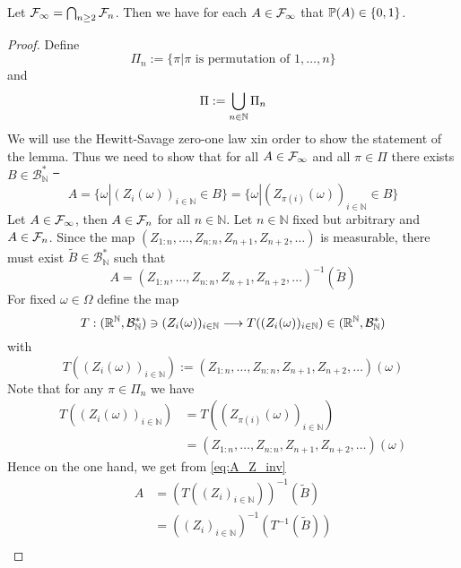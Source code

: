 \begin{lemma} \label{lem:hewitt_savage}
	Let $\F_\infty = \bigcap_{n\geq 2} \F_n$. Then we have for each $A\in \F_\infty$ that $\P(A)\in \{0,1\}$.
	\begin{proof}
		Define 
		\begin{equation*}
		\Pi_n := \{\pi | \pi \textrm{ is permutation of } 1,\dots, n\} \nonumber
		\end{equation*}	
		and
		\begin{equation*}
		\Pi := \bigcup\limits_{n\in\mathbb{N}} \Pi_n \nonumber\\	
		\end{equation*}
		We will use the Hewitt-Savage zero-one law xin order to show the statement of the lemma. Thus we need to show that for all $A\in\F_\infty$ and all $\pi\in\Pi$ there exists $B\in\mathcal{B}_\mathbb{N}^*$ \st\ 
		\begin{equation}
		A = \{\omega| (Z_i(\omega))_{i\in\mathbb{N}} \in B\} = \{\omega| (Z_{\pi(i)}(\omega))_{i\in\mathbb{N}} \in B\}
		\label{eq:hewitt_savage}
		\end{equation} 
		Let $A\in\F_\infty$, then $A\in\F_n$ for all $n\in\mathbb{N}$. Let $n\in\mathbb{N}$ fixed but arbitrary and $A\in\F_n$. Since the map $(Z_{1:n}, \dots, Z_{n:n}, Z_{n+1}, Z_{n+2}, \dots)$ is measurable, there must exist $\tilde{B}\in\mathcal{B}_\mathbb{N}^*$ such that
		\begin{equation}
		A = (Z_{1:n}, \dots, Z_{n:n}, Z_{n+1}, Z_{n+2}, \dots)^{-1}(\tilde{B})
		\label{eq:A_Z_inv}
		\end{equation}
		For fixed $\omega\in\Omega$ define the map 
		$$T: (\R^\mathbb{N}, \mathcal{B}_\mathbb{N}^*)\ni(Z_i(\omega))_{i\in\mathbb{N}} \longrightarrow T((Z_i(\omega))_{i\in\mathbb{N}})\in (\R^\mathbb{N}, \mathcal{B}_\mathbb{N}^*)$$
		with
		$$T((Z_i(\omega))_{i\in\mathbb{N}}):=(Z_{1:n}, \dots, Z_{n:n}, Z_{n+1}, Z_{n+2}, \dots)(\omega)$$
		Note that for any $\pi\in\Pi_n$ we have 
		\begin{align}
		T((Z_i(\omega))_{i\in\mathbb{N}}) &= T((Z_{\pi(i)}(\omega))_{i\in\mathbb{N}}) \label{eq:T_permutable}\\
		&= (Z_{1:n}, \dots, Z_{n:n}, Z_{n+1}, Z_{n+2}, \dots)(\omega) \nonumber
		\end{align}
		Hence on the one hand, we get from \eqref{eq:A_Z_inv}
		\begin{align*}
		A &= (T((Z_i)_{i\in\mathbb{N}}))^{-1}(\tilde{B}) \\
		&= ((Z_i)_{i\in\mathbb{N}})^{-1}(T^{-1}(\tilde{B}))\\

\end{align*}
\end{proof}
\end{lemma}

